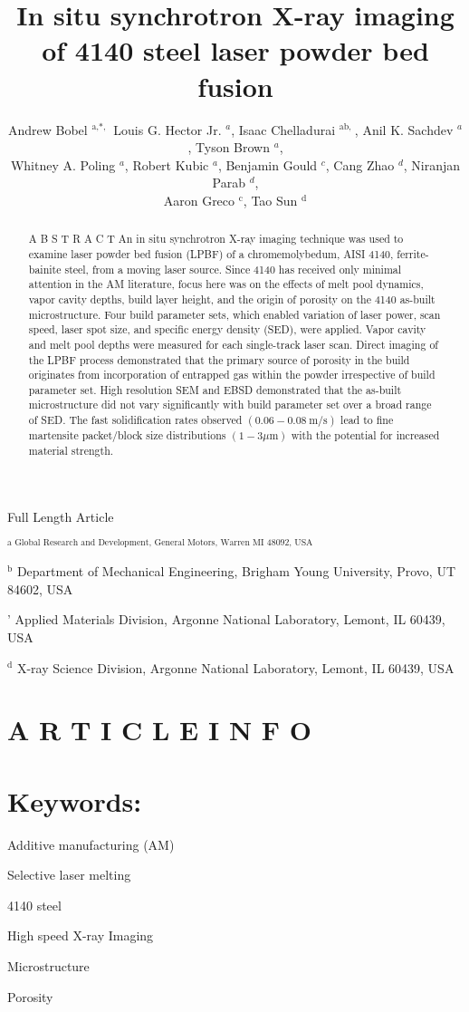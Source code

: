\documentclass[10pt]{article}
\title{In situ synchrotron X-ray imaging of 4140 steel laser powder bed fusion }
\author{Andrew Bobel ${ }^{\text {a,*, }}$ Louis G. Hector Jr. ${ }^{a}$, Isaac Chelladurai ${ }^{\text {ab, }}$, Anil K. Sachdev ${ }^{a}$, Tyson Brown ${ }^{a}$,\\
Whitney A. Poling ${ }^{a}$, Robert Kubic ${ }^{a}$, Benjamin Gould ${ }^{c}$, Cang Zhao ${ }^{d}$, Niranjan Parab ${ }^{d}$,\\
Aaron Greco ${ }^{\mathrm{c}}$, Tao Sun ${ }^{\mathrm{d}}$}
\date{}
\begin{document}
\maketitle
Full Length Article

${ }^{\text {a Global Research and Development, General Motors, Warren MI 48092, USA }}$

${ }^{\mathrm{b}}$ Department of Mechanical Engineering, Brigham Young University, Provo, UT 84602, USA

' Applied Materials Division, Argonne National Laboratory, Lemont, IL 60439, USA

${ }^{\mathrm{d}}$ X-ray Science Division, Argonne National Laboratory, Lemont, IL 60439, USA

\section*{A R T I C L E I N F O}
\section*{Keywords:}
Additive manufacturing (AM)

Selective laser melting

4140 steel

High speed X-ray Imaging

Microstructure

Porosity

\begin{abstract}
A B S T R A C T An in situ synchrotron X-ray imaging technique was used to examine laser powder bed fusion (LPBF) of a chromemolybedum, AISI 4140, ferrite-bainite steel, from a moving laser source. Since 4140 has received only minimal attention in the AM literature, focus here was on the effects of melt pool dynamics, vapor cavity depths, build layer height, and the origin of porosity on the 4140 as-built microstructure. Four build parameter sets, which enabled variation of laser power, scan speed, laser spot size, and specific energy density (SED), were applied. Vapor cavity and melt pool depths were measured for each single-track laser scan. Direct imaging of the LPBF process demonstrated that the primary source of porosity in the build originates from incorporation of entrapped gas within the powder irrespective of build parameter set. High resolution SEM and EBSD demonstrated that the as-built microstructure did not vary significantly with build parameter set over a broad range of SED. The fast solidification rates observed $(0.06-0.08 \mathrm{~m} / \mathrm{s})$ lead to fine martensite packet/block size distributions $(1-3 \mu \mathrm{m})$ with the potential for increased material strength.
\end{abstract}
\end{document}
